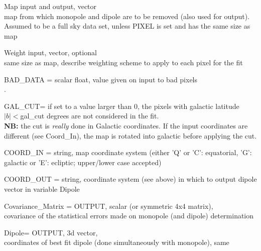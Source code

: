\begin{qualifiers}
  \begin{qulist}{} %
    \item[Map]  input and output, vector\\
	map from which monopole and dipole are to be removed
      (also used for output).
      Assumed to be a full sky data set, unless PIXEL is set and has the same
      size as map
    \item[Weight]  input, vector, optional\\
	same size as map,
     describe weighting scheme to apply to each pixel for the fit \\
    \item[BAD\_DATA =]  
    scalar float, value given on input to bad pixels \\
          .
    \item[GAL\_CUT=]  
    if set to a value larger than 0, the pixels with galactic
    latitude $|b|<$gal\_cut degrees are not considered in the
      fit. \\ {\bf NB:}
      the cut is {\em really} done in Galactic coordinates. If the input
      coordinates are different (see Coord\_In), the map is rotated into galactic
      before applying the cut.
    \item[COORD\_IN =]  
     string, map coordinate system (either 'Q' or 'C': equatorial,
    'G': galactic or 'E': ecliptic; upper/lower case accepted)\\
    \item[COORD\_OUT =]  
    string, coordinate system (see above) in which
    to output dipole vector in variable Dipole \\
    \item[Covariance\_Matrix =]  
    OUTPUT, scalar (or symmetric 4x4 matrix), \\ covariance
     of the statistical errors made on monopole (and dipole) determination
    \item[Dipole=]  
	OUTPUT, 3d vector, \\
        coordinates of best fit dipole (done simultaneously with monopole), same

\end{qulist}
\end{qualifiers}
